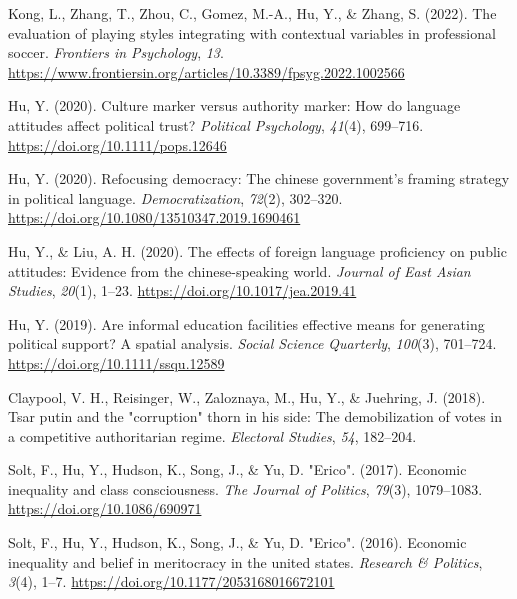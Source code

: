 \documentclass[
  12pt,
]
{article}
\newlength{\cslhangindent}
\newlength{\cslentryspacingunit} %
\newenvironment{CSLReferences}[2] %
 {%
  \setlength{\parindent}{0pt}
  \ifodd #1
  \let\oldpar\par
  \def\par{\hangindent=\cslhangindent\oldpar}
  \fi
  \setlength{\parskip}{#2\cslentryspacingunit}
 }%
 {}
\begin{document}
\begin{CSLReferences}{1}{0}
\leavevmode{}%
Kong, L., Zhang, T., Zhou, C., Gomez, M.-A., Hu, Y., \& Zhang, S.
(2022). The evaluation of playing styles integrating with contextual
variables in professional soccer. \emph{Frontiers in Psychology},
\emph{13}.
\url{https://www.frontiersin.org/articles/10.3389/fpsyg.2022.1002566}

\leavevmode{}%
Hu, Y. (2020). Culture marker versus authority marker: How do language
attitudes affect political trust? \emph{Political Psychology},
\emph{41}(4), 699--716. \url{https://doi.org/10.1111/pops.12646}

\leavevmode{}%
Hu, Y. (2020). Refocusing democracy: The chinese government's framing
strategy in political language. \emph{Democratization}, \emph{72}(2),
302--320. \url{https://doi.org/10.1080/13510347.2019.1690461}

\leavevmode{}%
Hu, Y., \& Liu, A. H. (2020). The effects of foreign language
proficiency on public attitudes: Evidence from the chinese-speaking
world. \emph{Journal of East Asian Studies}, \emph{20}(1), 1--23.
\url{https://doi.org/10.1017/jea.2019.41}

\leavevmode{}%
Hu, Y. (2019). Are informal education facilities effective means for
generating political support? {A} spatial analysis. \emph{Social Science
Quarterly}, \emph{100}(3), 701--724.
\url{https://doi.org/10.1111/ssqu.12589}

\leavevmode{}%
Claypool, V. H., Reisinger, W., Zaloznaya, M., Hu, Y., \& Juehring, J.
(2018). Tsar putin and the "corruption" thorn in his side: The
demobilization of votes in a competitive authoritarian regime.
\emph{Electoral Studies}, \emph{54}, 182--204.

\leavevmode{}%
Solt, F., Hu, Y., Hudson, K., Song, J., \& Yu, D. "Erico". (2017).
Economic inequality and class consciousness. \emph{The Journal of
Politics}, \emph{79}(3), 1079--1083.
\url{https://doi.org/10.1086/690971}

\leavevmode{}%
Solt, F., Hu, Y., Hudson, K., Song, J., \& Yu, D. "Erico". (2016).
Economic inequality and belief in meritocracy in the united states.
\emph{Research \& Politics}, \emph{3}(4), 1--7.
\url{https://doi.org/10.1177/2053168016672101}


\end{CSLReferences}
\end{document}
